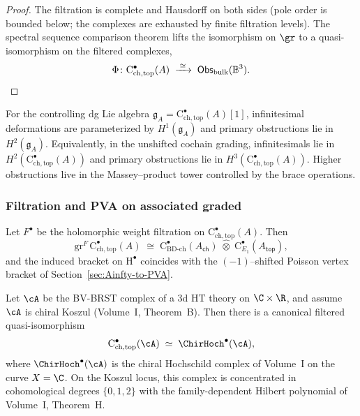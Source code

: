 \begin{proof}
The filtration is complete and Hausdorff on both sides (pole order is bounded below; the complexes are exhausted by finite filtration levels). The spectral sequence comparison theorem lifts the isomorphism on $\gr$ to a quasi-isomorphism on the filtered complexes,
\[
\Phi \colon \mathrm{C}^\bullet_{\mathrm{ch,top}}(A) \;\xrightarrow{\;\simeq\;}\; \mathsf{Obs}_{\mathrm{bulk}}(\mathbb{B}^3). \qedhere
\]
\end{proof}

\begin{corollary}
\label{cor:obstructions}
For the controlling dg Lie algebra
$\mathfrak g_A=\mathrm{C}^\bullet_{\mathrm{ch,top}}(A)[1]$,
infinitesimal deformations are parameterized by
$H^1(\mathfrak g_A)$ and primary obstructions lie in
$H^2(\mathfrak g_A)$. Equivalently, in the unshifted cochain grading,
infinitesimals lie in
$H^2(\mathrm{C}^\bullet_{\mathrm{ch,top}}(A))$ and primary
obstructions lie in
$H^3(\mathrm{C}^\bullet_{\mathrm{ch,top}}(A))$. Higher obstructions
live in the Massey--product tower controlled by the brace operations.
\end{corollary}

\subsubsection{Filtration and PVA on associated graded}
\label{subsec:filtration-PVA}
Let $F^\bullet$ be the holomorphic weight filtration on $\mathrm{C}^\bullet_{\mathrm{ch,top}}(A)$. Then
\[
\mathrm{gr}^F\, \mathrm{C}^\bullet_{\mathrm{ch,top}}(A)
\;\cong\;
\mathrm{C}^\bullet_{\mathrm{BD\text{-}ch}}(A_{\mathsf{ch}})\;\widehat\otimes\; \mathrm{C}^\bullet_{E_1}(A_{\mathsf{top}}),
\]
and the induced bracket on $\mathrm{H}^\bullet$ coincides with the $(-1)$--shifted Poisson vertex bracket of Section~\ref{sec:Ainfty-to-PVA}.

\begin{theorem}
\label{thm:hochschild-bridge-genus0}
Let $\cA$ be the BV-BRST complex of a
3d HT theory on $\C \times \R$, and assume $\cA$ is chiral Koszul
(Volume~I, Theorem~B). Then there is a canonical filtered
quasi-isomorphism
\[
\mathrm{C}^\bullet_{\mathrm{ch,top}}(\cA)
\;\simeq\;
\ChirHoch^\bullet(\cA),
\]
where $\ChirHoch^\bullet(\cA)$ is the chiral Hochschild complex of
Volume~I on the curve $X = \C$. On the Koszul locus, this complex
is concentrated in cohomological degrees $\{0,1,2\}$ with the
family-dependent Hilbert polynomial of Volume~I, Theorem~H.
\end{theorem}

